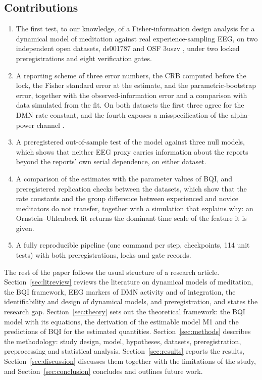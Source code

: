 \subsection{Contributions}
\begin{enumerate}
  \item The first test, to our knowledge, of a Fisher-information design analysis for a dynamical model of meditation against real experience-sampling EEG, on two independent open datasets, ds001787 \cite{Brandmeyer2018,Delorme2024ds} and OSF 3uszv \cite{RodriguezLarios2021}, under two locked preregistrations and eight verification gates.
  \item A reporting scheme of three error numbers, the CRB computed before the lock, the Fisher standard error at the estimate, and the parametric-bootstrap error, together with the observed-information error and a comparison with data simulated from the fit. On both datasets the first three agree for the DMN rate constant, and the fourth exposes a misspecification of the alpha-power channel \cite{White1982}.
  \item A preregistered out-of-sample test of the model against three null models, which shows that neither EEG proxy carries information about the reports beyond the reports' own serial dependence, on either dataset.
  \item A comparison of the estimates with the parameter values of BQI, and preregistered replication checks between the datasets, which show that the rate constants and the group difference between experienced and novice meditators do not transfer, together with a simulation that explains why: an Ornstein--Uhlenbeck fit returns the dominant time scale of the feature it is given.
  \item A fully reproducible pipeline (one command per step, checkpoints, 114 unit tests) with both preregistrations, locks and gate records.
\end{enumerate}

The rest of the paper follows the usual structure of a research article. Section~\ref{sec:litreview} reviews the literature on dynamical models of meditation, the BQI framework, EEG markers of DMN activity and of integration, the identifiability and design of dynamical models, and preregistration, and states the research gap. Section~\ref{sec:theory} sets out the theoretical framework: the BQI model with its equations, the derivation of the estimable model M1 and the predictions of BQI for the estimated quantities. Section~\ref{sec:methods} describes the methodology: study design, model, hypotheses, datasets, preregistration, preprocessing and statistical analysis. Section~\ref{sec:results} reports the results, Section~\ref{sec:discussion} discusses them together with the limitations of the study, and Section~\ref{sec:conclusion} concludes and outlines future work.
